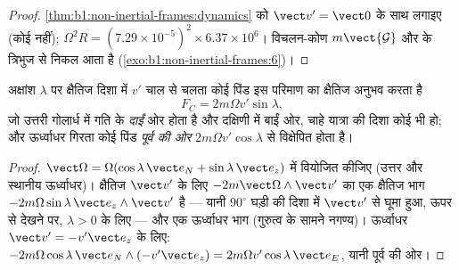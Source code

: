 \begin{proof}
\cref{thm:b1:non-inertial-frames:dynamics} को $\vect v' = \vect 0$ के साथ
लगाइए (कोई  नहीं); $\Omega^2R = (7.29\times10^{-5})^2 \times 6.37\times10^6$।
विचलन-कोण $m\vect{\mathcal G}$ और  के त्रिभुज से निकल आता है
(\cref{exo:b1:non-inertial-frames:6})।
\end{proof}

\begin{proposition}[पृथ्वी पर कोरिओलिस बल]\label{prop:b1:non-inertial-frames:coriolis}
अक्षांश $\lambda$ पर क्षैतिज दिशा में $v'$ चाल से चलता कोई पिंड इस परिमाण
का क्षैतिज  अनुभव करता है
\[
F_C = 2m\Omega v'\sin\lambda ,
\]
जो उत्तरी गोलार्ध में गति के \emph{दाईं} ओर होता है और दक्षिणी में बाईं
ओर, चाहे यात्रा की दिशा कोई भी हो; और ऊर्ध्वाधर गिरता कोई पिंड
\emph{पूर्व की ओर} $2m\Omega v'\cos\lambda$ से विक्षेपित होता है।
\end{proposition}

\begin{proof}
$\vect\Omega = \Omega(\cos\lambda\,\vect e_N + \sin\lambda\,\vect e_z)$ में वियोजित
कीजिए (उत्तर और स्थानीय ऊर्ध्वाधर)। क्षैतिज $\vect v'$ के लिए $-2m\vect\Omega\wedge\vect v'$
का एक क्षैतिज भाग $-2m\Omega\sin\lambda\,\vect e_z\wedge\vect v'$ है --- यानी
$90^\circ$ घड़ी की दिशा में $\vect v'$ से घूमा हुआ, ऊपर से देखने पर, $\lambda > 0$ के लिए ---
और एक ऊर्ध्वाधर भाग (गुरुत्व के सामने नगण्य)। ऊर्ध्वाधर $\vect v' =
-v'\vect e_z$ के लिए: $-2m\Omega\cos\lambda\,\vect e_N\wedge(-v'\vect e_z) = 2m\Omega v'\cos\lambda\,
\vect e_E$, यानी पूर्व की ओर।
\end{proof}

